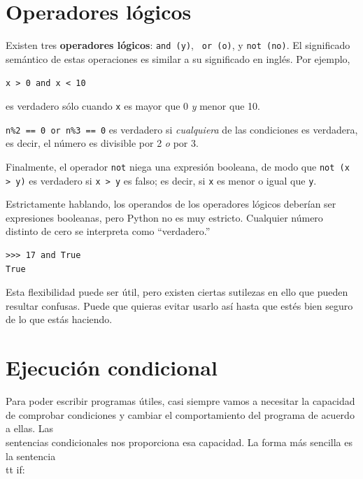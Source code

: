 

\section {Operadores lógicos}

Existen tres {\bf operadores lógicos}: {\tt and (y)}, {\tt
or (o)}, y {\tt not (no)}. El significado semántico de estas operaciones
es similar a su significado en inglés. Por ejemplo, 

{\tt x > 0 and x < 10} 

es verdadero sólo cuando {\tt x} es mayor que 0
\emph{y} menor que 10.


{\tt n\%2 == 0 or n\%3 == 0} es verdadero si \emph{cualquiera} de las condiciones
es verdadera, es decir, el número es divisible por 2 \emph{o} por 3.

Finalmente, el operador {\tt not} niega una expresión
booleana, de modo que {\tt not (x > y)} es verdadero si {\tt x > y} es falso;
es decir, si {\tt x} es menor o igual que {\tt y}.

Estrictamente hablando, los operandos de los operadores lógicos deberían ser
expresiones booleanas, pero Python no es muy estricto.
Cualquier número distinto de cero se interpreta como ``verdadero.''

\beforeverb
\begin{verbatim}
>>> 17 and True
True
\end{verbatim}
\afterverb
%
Esta flexibilidad puede ser útil, pero existen ciertas sutilezas en
ello que pueden resultar confusas. Puede que quieras evitar usarlo así
hasta que estés bien seguro de lo que estás haciendo.

\section{Ejecución condicional}
\label{conditional execution}


Para poder escribir programas útiles, casi siempre vamos a necesitar
la capacidad de comprobar condiciones y cambiar el comportamiento del programa
de acuerdo a ellas. Las {\\ sentencias condicionales} nos proporciona esa capacidad.
La forma más sencilla es la sentencia {\\tt if}:

